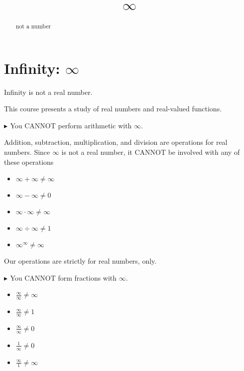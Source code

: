 \documentclass{ximera}
\title{$\infty$}
\begin{document}
\begin{abstract}
not a number
\end{abstract}
\maketitle




\section{Infinity: $\infty$}


\begin{center}
Infinity is not a real number.
\end{center}




This course presents a study of real numbers and real-valued functions.




\textbf{\textcolor{red!90!darkgray}{$\blacktriangleright$ }} You CANNOT perform arithmetic with $\infty$.

Addition, subtraction, multiplication, and division are operations for real numbers.  Since $\infty$ is not a real number, it CANNOT be involved with any of these operations


\begin{example}


\begin{itemize}
\item $\infty + \infty \ne \infty$
\item $\infty - \infty \ne 0$
\item $\infty \cdot \infty \ne \infty$
\item $\infty \div \infty \ne 1$
\item $\infty^{\infty} \ne \infty$
\end{itemize}


\end{example}

Our operations are strictly for real numbers, only.









\textbf{\textcolor{red!90!darkgray}{$\blacktriangleright$ }} You CANNOT form fractions with $\infty$.



\begin{example}


\begin{itemize}
\item $\frac{\infty}{\infty} \ne \infty$
\item $\frac{\infty}{\infty} \ne 1$
\item $\frac{\infty}{\infty} \ne 0$
\item $\frac{1}{\infty} \ne 0$
\item $\frac{\infty}{1} \ne \infty$
\end{itemize}


\end{example}
\end{document}
